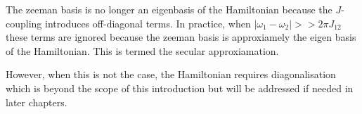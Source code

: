 The zeeman basis is no longer an eigenbasis of the Hamiltonian because the $J$-coupling
introduces off-diagonal terms. In practice, when $|\omega_1-\omega_2| >> 2\pi J_{12}$
these terms are ignored because the zeeman basis is approxiamely the eigen basis of the Hamiltonian. This is termed the secular approxiamation.

However, when this is not the case, the Hamiltonian requires diagonalisation which is beyond the scope of this introduction but will be addressed if needed in later chapters.
